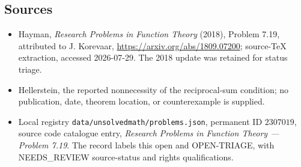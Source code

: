 \documentclass[11pt]{article}
\begin{document}
\subsection{Sources}
\begin{itemize}
\item Hayman, \emph{Research Problems in Function Theory} (2018), Problem 7.19, attributed to J. Korevaar, \url{https://arxiv.org/abs/1809.07200}; source-TeX extraction, accessed 2026-07-29. The 2018 update was retained for status triage.
\item Hellerstein, the reported nonnecessity of the reciprocal-sum condition; no publication, date, theorem location, or counterexample is supplied.
\item Local registry \texttt{data/unsolvedmath/problems.json}, permanent ID $2307019$, source code catalogue entry, \emph{Research Problems in Function Theory --- Problem 7.19}. The record labels this open and OPEN-TRIAGE, with NEEDS\_REVIEW source-status and rights qualifications.
\end{itemize}
\end{document}
